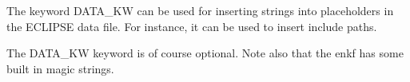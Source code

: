 \documentclass[a4paper,10pt,english]{sphinxmanual}
\begin{document}
\label{\detokenize{keywords/index:data-kw}}
\begin{sphinxShadowBox}

The keyword DATA\_KW can be used for inserting strings into placeholders in the
ECLIPSE data file. For instance, it can be used to insert include paths.


%
\begin{sphinxVerbatim}[commandchars=\\\{\}]
             
           
     
    
\end{sphinxVerbatim}

The DATA\_KW keyword is of course optional. Note also that the enkf has some
built in magic strings.
\end{sphinxShadowBox}
\label{\detokenize{keywords/index:delete-runpath}}
\end{document}
